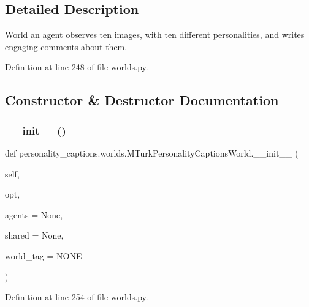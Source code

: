 \subsection{Detailed Description}
\begin{DoxyVerb}World an agent observes ten images, with ten different personalities, and writes
engaging comments about them.
\end{DoxyVerb}
 

Definition at line 248 of file worlds.\+py.



\subsection{Constructor \& Destructor Documentation}
\mbox{\label{classpersonality__captions_1_1worlds_1_1MTurkPersonalityCaptionsWorld_ab05199b7af0da7a70a52e5f563b7511d}} 
\subsubsection{\texorpdfstring{\+\_\+\+\_\+init\+\_\+\+\_\+()}{\_\_init\_\_()}}
{\footnotesize\ttfamily def personality\+\_\+captions.\+worlds.\+M\+Turk\+Personality\+Captions\+World.\+\_\+\+\_\+init\+\_\+\+\_\+ (\begin{DoxyParamCaption}\item[{}]{self,  }\item[{}]{opt,  }\item[{}]{agents = {\ttfamily None},  }\item[{}]{shared = {\ttfamily None},  }\item[{}]{world\+\_\+tag = {\ttfamily \textquotesingle{}NONE\textquotesingle{}} }\end{DoxyParamCaption})}



Definition at line 254 of file worlds.\+py.



